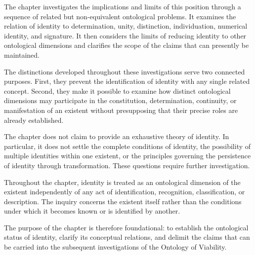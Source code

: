 The chapter investigates the implications and limits
of this position through a sequence of related but
non-equivalent ontological problems. It examines the
relation of identity to determination, unity, distinction,
individuation, numerical identity, and signature. It then
considers the limits of reducing identity to other
ontological dimensions and clarifies the scope of the
claims that can presently be maintained.

The distinctions developed throughout these investigations
serve two connected purposes. First, they prevent the
identification of identity with any single related concept.
Second, they make it possible to examine how distinct
ontological dimensions may participate in the constitution,
determination, continuity, or manifestation of an existent
without presupposing that their precise roles are already
established.

The chapter does not claim to provide an exhaustive theory
of identity. In particular, it does not settle the complete
conditions of identity, the possibility of multiple
identities within one existent, or the principles governing
the persistence of identity through transformation.
These questions require further investigation.

Throughout the chapter, identity is treated as an
ontological dimension of the existent independently
of any act of identification, recognition, classification,
or description. The inquiry concerns the existent itself
rather than the conditions under which it becomes known
or is identified by another.

The purpose of the chapter is therefore foundational:
to establish the ontological status of identity, clarify
its conceptual relations, and delimit the claims that
can be carried into the subsequent investigations of
the Ontology of Viability.










